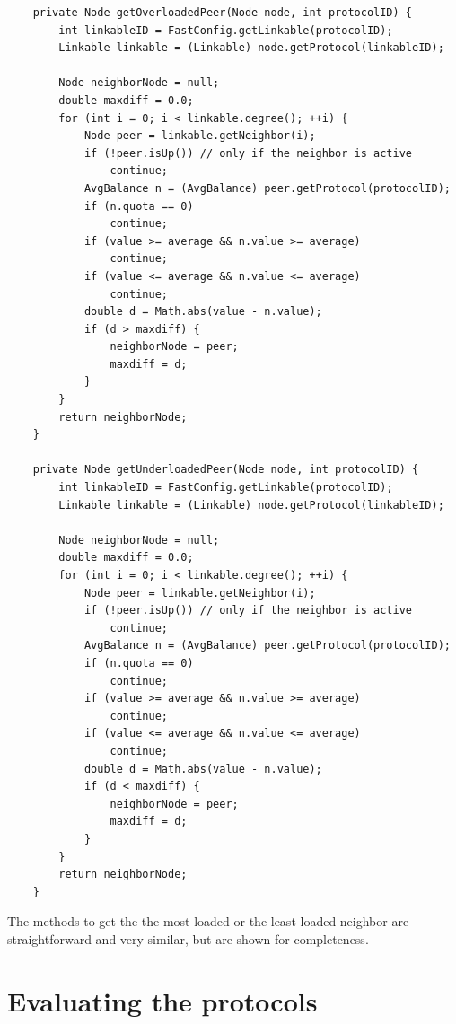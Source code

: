 \documentclass[a4paper,11pt]{article}
\begin{document}
\footnotesize
\begin{verbatim}
    private Node getOverloadedPeer(Node node, int protocolID) {
        int linkableID = FastConfig.getLinkable(protocolID);
        Linkable linkable = (Linkable) node.getProtocol(linkableID);

        Node neighborNode = null;
        double maxdiff = 0.0;
        for (int i = 0; i < linkable.degree(); ++i) {
            Node peer = linkable.getNeighbor(i);
            if (!peer.isUp()) // only if the neighbor is active
                continue;
            AvgBalance n = (AvgBalance) peer.getProtocol(protocolID);
            if (n.quota == 0)
                continue;
            if (value >= average && n.value >= average)
                continue;
            if (value <= average && n.value <= average)
                continue;
            double d = Math.abs(value - n.value);
            if (d > maxdiff) {
                neighborNode = peer;
                maxdiff = d;
            }
        }
        return neighborNode;
    }

    private Node getUnderloadedPeer(Node node, int protocolID) {
        int linkableID = FastConfig.getLinkable(protocolID);
        Linkable linkable = (Linkable) node.getProtocol(linkableID);

        Node neighborNode = null;
        double maxdiff = 0.0;
        for (int i = 0; i < linkable.degree(); ++i) {
            Node peer = linkable.getNeighbor(i);
            if (!peer.isUp()) // only if the neighbor is active
                continue;
            AvgBalance n = (AvgBalance) peer.getProtocol(protocolID);
            if (n.quota == 0)
                continue;
            if (value >= average && n.value >= average)
                continue;
            if (value <= average && n.value <= average)
                continue;
            double d = Math.abs(value - n.value);
            if (d < maxdiff) {
                neighborNode = peer;
                maxdiff = d;
            }
        }
        return neighborNode;
    }
\end{verbatim}
\normalsize

The methods to get the the most loaded or the least loaded neighbor
are straightforward and very similar, but are shown for completeness.


\section{Evaluating the protocols}
\end{document}
